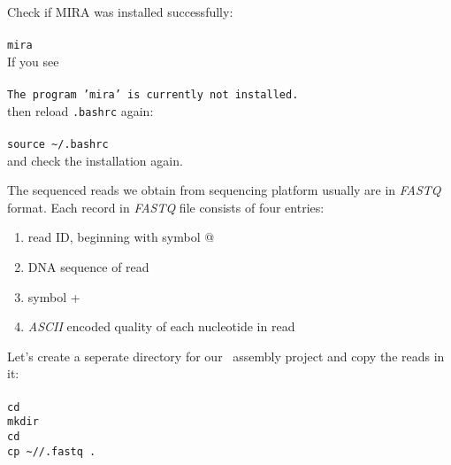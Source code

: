 Check if MIRA was installed successfully:\\~\\
\texttt{mira}\\

If you see\\~\\
\texttt{The program 'mira' is currently not installed.}\\

then reload \texttt{.bashrc} again:\\~\\
\texttt{source \textasciitilde/.bashrc}\\

and check the installation again.

The sequenced reads we obtain from sequencing platform usually are in \textit{FASTQ} format.
Each record in \textit{FASTQ} file consists of four entries:
\begin{enumerate}
  \item read ID, beginning with symbol @
  \item DNA sequence of read
  \item symbol +
  \item \textit{ASCII} encoded quality of each nucleotide in read
\end{enumerate}

Let's create a seperate directory for our \denovo~assembly project 
and copy the reads in it:\\~\\
\texttt{cd \workDir}\\
\texttt{mkdir \denovoDir}\\
\texttt{cd \denovoDir}\\
\texttt{cp \textasciitilde/\dataDir/\denovoReads.fastq~.}\\

